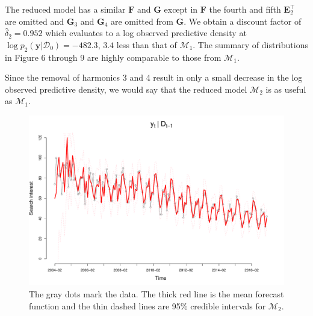 \documentclass[12pt]{article}
\newcommand{\m}[1]{\mathbf{\bm{#1}}}
\begin{document}
\noindent The reduced model has a similar $\m{F}$ and $\m{G}$ except in $\m{F}$ the fourth and fifth $\m{E}_2^\top$ are omitted and $\m{G}_3$ and $\m{G}_4$ are omitted from $\m{G}$. We obtain a discount factor of $\hat{\delta}_2=0.952$ which evaluates to a log observed predictive density at $\log p_2(\m{y}|\mathcal{D}_0)=-482.3$, $3.4$ less than that of $\mathcal{M}_1$. The summary of distributions in Figure 6 through 9 are highly comparable to those from $\mathcal{M}_1$.
\bigskip

\noindent Since the removal of harmonics 3 and 4 result in only a small decrease in the log observed predictive density, we would say that the reduced model $\mathcal{M}_2$ is as useful as $\mathcal{M}_1$.

\newpage
\begin{figure}[H]
\begin{center}
\includegraphics[scale=0.37]{figs/m2_onestep.pdf}
\end{center}
\caption{The gray dots mark the data. The thick red line is the mean forecast function and the thin dashed lines are 95\% credible intervals for $\mathcal{M}_2$.}
\end{figure}
\end{document}
